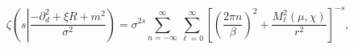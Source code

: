\begin{equation}
\zeta \left(s \left| \frac{-\partial _{d}^{2}+\xi R+m^{2}}{\sigma ^{2}}\right.
\right)=\sigma ^{2s}\sum _{n=-\infty }^{\infty }\sum _{\ell =0}^{\infty }\left[\left(\frac{2\pi n}{\beta }\right)^{2}+\frac{M_{\ell }^{2}\left(\mu ,\chi \right)}{r^{2}}\right]^{-s},\end{equation}

